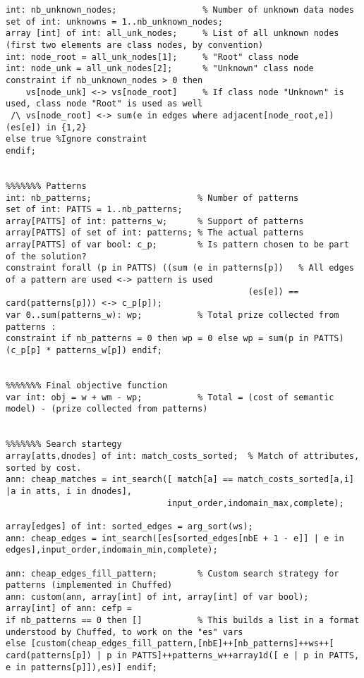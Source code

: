 \documentclass[letterpaper]{article} %
\newcommand{\minizinc}{\textsc{MiniZinc}}
\begin{document}
\clearpage
\newpage
\begin{minipage}{\textwidth}
	\begin{lstlisting}[caption={\minizinc{} model (part 2 of 2)},captionpos=b]
%%%%%%% Unknown nodes
int: nb_unknown_nodes;                 % Number of unknown data nodes
set of int: unknowns = 1..nb_unknown_nodes;
array [int] of int: all_unk_nodes;     % List of all unknown nodes (first two elements are class nodes, by convention)
int: node_root = all_unk_nodes[1];     % "Root" class node
int: node_unk = all_unk_nodes[2];      % "Unknown" class node
constraint if nb_unknown_nodes > 0 then
    vs[node_unk] <-> vs[node_root]     % If class node "Unknown" is used, class node "Root" is used as well
 /\ vs[node_root] <-> sum(e in edges where adjacent[node_root,e])(es[e]) in {1,2}
else true %Ignore constraint
endif;


%%%%%%% Patterns
int: nb_patterns;                     % Number of patterns
set of int: PATTS = 1..nb_patterns;
array[PATTS] of int: patterns_w;      % Support of patterns
array[PATTS] of set of int: patterns; % The actual patterns
array[PATTS] of var bool: c_p;        % Is pattern chosen to be part of the solution?
constraint forall (p in PATTS) ((sum (e in patterns[p])   % All edges of a pattern are used <-> pattern is used
							                  	(es[e]) == card(patterns[p])) <-> c_p[p]);
var 0..sum(patterns_w): wp;           % Total prize collected from patterns : 
constraint if nb_patterns = 0 then wp = 0 else wp = sum(p in PATTS) (c_p[p] * patterns_w[p]) endif;


%%%%%%% Final objective function 
var int: obj = w + wm - wp;           % Total = (cost of semantic model) - (prize collected from patterns)


%%%%%%% Search startegy
array[atts,dnodes] of int: match_costs_sorted;  % Match of attributes, sorted by cost.
ann: cheap_matches = int_search([ match[a] == match_costs_sorted[a,i] |a in atts, i in dnodes], 
                                input_order,indomain_max,complete);

array[edges] of int: sorted_edges = arg_sort(ws);
ann: cheap_edges = int_search([es[sorted_edges[nbE + 1 - e]] | e in edges],input_order,indomain_min,complete);

ann: cheap_edges_fill_pattern;        % Custom search strategy for patterns (implemented in Chuffed)
ann: custom(ann, array[int] of int, array[int] of var bool);
array[int] of ann: cefp = 
if nb_patterns == 0 then []           % This builds a list in a format understood by Chuffed, to work on the "es" vars 
else [custom(cheap_edges_fill_pattern,[nbE]++[nb_patterns]++ws++[ card(patterns[p]) | p in PATTS]++patterns_w++array1d([ e | p in PATTS, e in patterns[p]]),es)] endif;


\end{lstlisting}
\end{minipage}
\end{document}
